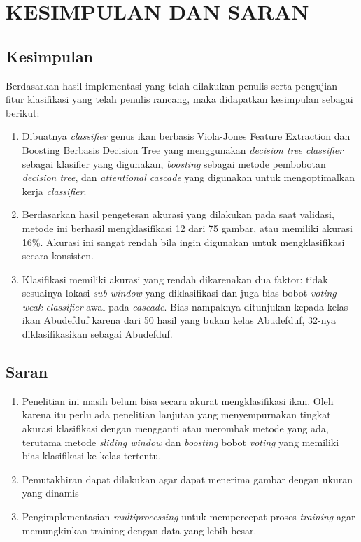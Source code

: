 
\chapter{KESIMPULAN DAN SARAN}

\section{Kesimpulan}
Berdasarkan hasil implementasi yang telah dilakukan penulis serta pengujian fitur klasifikasi yang 
telah penulis rancang, maka didapatkan kesimpulan sebagai berikut:

\begin{enumerate}
	\item Dibuatnya \textit{classifier} genus ikan berbasis Viola-Jones Feature Extraction dan Boosting
	Berbasis Decision Tree yang menggunakan \emph{decision tree classifier} 
	sebagai klasifier yang digunakan, \emph{boosting} sebagai metode pembobotan 
	\emph{decision tree}, dan 
	\emph{attentional cascade} yang digunakan untuk mengoptimalkan kerja \emph{classifier}.

	\item Berdasarkan hasil pengetesan akurasi yang dilakukan pada saat validasi, metode ini 
	berhasil mengklasifikasi 12 dari 75 gambar, atau memiliki akurasi 16\%. Akurasi ini 
	sangat rendah bila ingin digunakan untuk mengklasifikasi secara konsisten.

	\item Klasifikasi memiliki akurasi yang rendah dikarenakan dua faktor: tidak 
	sesuainya lokasi \emph{sub-window} yang diklasifikasi dan juga bias bobot \textit{voting} 
	\emph{weak classifier} awal pada \emph{cascade}. Bias nampaknya ditunjukan kepada kelas 
	ikan Abudefduf karena dari 50 hasil yang bukan kelas Abudefduf, 32-nya diklasifikasikan 
	sebagai Abudefduf.

\end{enumerate}

\section{Saran}
\begin{enumerate}
	\item Penelitian ini masih belum bisa secara akurat mengklasifikasi ikan. Oleh 
	karena itu perlu ada penelitian lanjutan yang menyempurnakan tingkat akurasi klasifikasi 
	dengan mengganti atau merombak metode yang ada, terutama metode \emph{sliding window} 
	dan \emph{boosting} bobot \textit{voting} yang memiliki bias klasifikasi ke kelas tertentu.
	\item Pemutakhiran dapat dilakukan agar dapat menerima gambar dengan ukuran yang 
	dinamis 
	\item Pengimplementasian \textit{multiprocessing} untuk mempercepat proses 
	\textit{training} agar memungkinkan training dengan data yang lebih besar.
\end{enumerate}

\begin{comment}

\end{comment}

